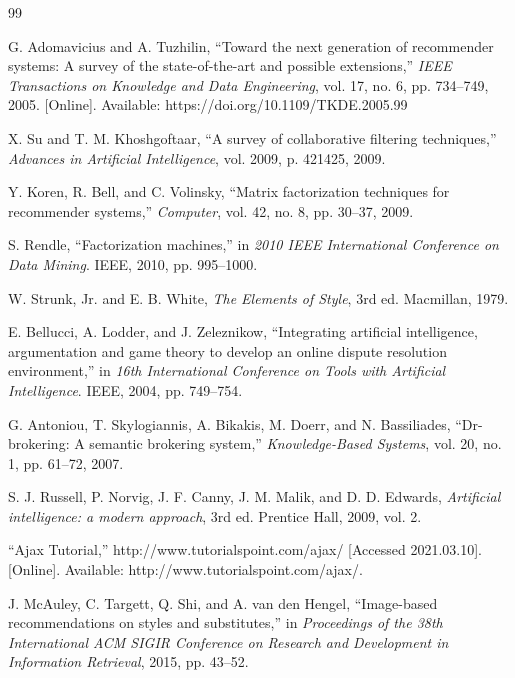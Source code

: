 \begin{thebibliography}{99}

G. Adomavicius and A. Tuzhilin, “Toward the next generation of recommender systems: A survey of the state-of-the-art and possible extensions,” \textit{IEEE Transactions on Knowledge and Data Engineering}, vol. 17, no. 6, pp. 734–749, 2005. [Online]. Available: https://doi.org/10.1109/TKDE.2005.99

X. Su and T. M. Khoshgoftaar, “A survey of collaborative filtering techniques,” \textit{Advances in Artificial Intelligence}, vol. 2009, p. 421425, 2009.

Y. Koren, R. Bell, and C. Volinsky, “Matrix factorization techniques for recommender systems,” \textit{Computer}, vol. 42, no. 8, pp. 30–37, 2009.

S. Rendle, “Factorization machines,” in \textit{2010 IEEE International Conference on Data Mining}. IEEE, 2010, pp. 995–1000.

W. Strunk, Jr. and E. B. White, \textit{The Elements of Style}, 3rd ed. Macmillan, 1979.

E. Bellucci, A. Lodder, and J. Zeleznikow, “Integrating artificial intelligence, argumentation and game theory to develop an online dispute resolution environment,” in \textit{16th International Conference on Tools with Artificial Intelligence}. IEEE, 2004, pp. 749–754.

G. Antoniou, T. Skylogiannis, A. Bikakis, M. Doerr, and N. Bassiliades, “Dr-brokering: A semantic brokering system,” \textit{Knowledge-Based Systems}, vol. 20, no. 1, pp. 61–72, 2007.

S. J. Russell, P. Norvig, J. F. Canny, J. M. Malik, and D. D. Edwards, \textit{Artificial intelligence: a modern approach}, 3rd ed. Prentice Hall, 2009, vol. 2.

“Ajax Tutorial,” http://www.tutorialspoint.com/ajax/ [Accessed 2021.03.10]. [Online]. Available: http://www.tutorialspoint.com/ajax/.

J. McAuley, C. Targett, Q. Shi, and A. van den Hengel, “Image-based recommendations on styles and substitutes,” in \textit{Proceedings of the 38th International ACM SIGIR Conference on Research and Development in Information Retrieval}, 2015, pp. 43–52.


\end{thebibliography}
